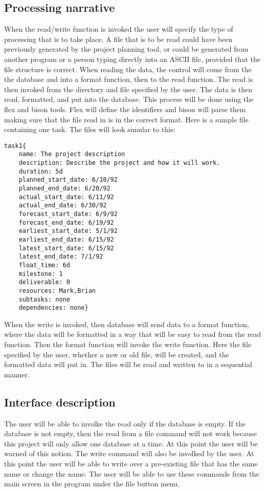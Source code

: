         \subsection{Processing narrative}
When the read/write function is invoked the user will specify the type
of processing that is to take place. A file that is to be read could
have been previously generated by the project planning tool, or could
be generated from another program or a person typing directly into an
ASCII file, provided that the file structure is correct.
When reading
the data, the control will come from the the database and into a
format function, then to the read function. The read is then invoked
from the directory and file specified by the user. The data is then
read, formatted, and put into the database. This process will be done using the
flex and bison tools. Flex will define the identifiers and bison will parse them
making sure that the file read in is in the correct format. Here is a sample
file containing one task. The files will look simular to this:
\begin{verbatim}
task1{
    name: The project description
    description: Describe the project and how it will work.
    duration: 5d
    planned_start_date: 6/10/92
    planned_end_date: 6/20/92
    actual_start_date: 6/11/92
    actual_end_date: 6/30/92
    forecast_start_date: 6/9/92
    forecast_end_date: 6/19/92
    earliest_start_date: 5/1/92
    earliest_end_date: 6/15/92
    latest_start_date: 6/15/92
    latest_end_date: 7/1/92
    float_time: 6d
    milestone: 1
    deliverable: 0
    resources: Mark,Brian
    subtasks: none
    dependencies: none}
\end{verbatim}
When the write is invoked,
then database will send data to a format function, where the data will
be formatted in a way that will be easy to read from the read
function. Then the format function will invoke the write function.
Here the file specified by the user, whether a new or old file, will
be created, and the formatted data will put in. The files will be read
and written to in a sequential manner.
        \subsection{Interface description}
        The user will be able to involke the read only if the database is empty.
If the database is not empty, then the read from a file command will not work
because this project will only allow one database at a time. At this point the
user will be warned of this notion. The write command will also be involked by
the user. At this point the user will be able to write over a pre-existing file
that has the same name or change the name. The user will be able to use these
commands from the main screen in the program under the file button menu.

